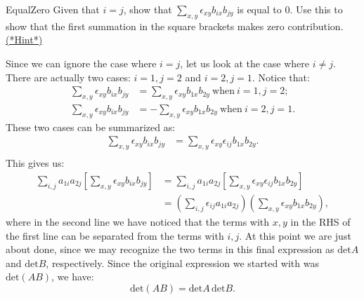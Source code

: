 \begin{exercise}{EqualZero}
Given that $i=j$, show that $\sum_{x,y} \epsilon_{xy}  b_{ix}b_{jy}$  is equal to 0. Use this to show that the first summation in the square brackets makes zero contribution. \hyperref[sec:sigma:hints]{(*Hint*)} 
\end{exercise}
Since we can ignore the case where $i=j$, let us look at the case where $i \neq j$.  There are actually two cases: $i=1, j=2$ and $i=2, j=1$.  Notice that:
\begin{align*}
 \sum_{x,y}\epsilon_{xy} b_{ix}b_{jy}&= \sum_{x,y} \epsilon_{xy} b_{1x}b_{2y}~\text{when}~i=1,j=2;\\
\sum_{x,y} \epsilon_{xy} b_{ix}b_{jy}&= - \sum_{x,y}\epsilon_{xy} b_{1x}b_{2y}~\text{when}~i=2,j=1.
\end{align*}
These two cases can be summarized as:
\begin{align*}
\sum_{x,y} \epsilon_{xy} b_{ix}b_{jy}&=\sum_{x,y}\epsilon_{xy}\epsilon_{ij} b_{1x}b_{2y}.\\
\end{align*}
This gives us:
\begin{align*}
 \sum_{i,j}  a_{1i}a_{2j} \left[\sum_{x,y} \epsilon_{xy} b_{ix}b_{jy}\right]&=  \sum_{i,j}  a_{1i}a_{2j} \left[\sum_{x,y} \epsilon_{xy} \epsilon_{ij} b_{1x}b_{2y}\right]\\
&=  \left(\sum_{i,j}\epsilon_{ij}   a_{1i}a_{2j}\right)\left(\sum_{x,y}  \epsilon_{xy} b_{1x}b_{2y}\right),
\end{align*}
where in the second line we have noticed that the terms with $x,y$ in the RHS of the first line can be separated from the terms with $i,j$.
At this point we are just about done, since we may recognize the two terms in this final expression as $\text{det} A$ and $\text{det} B$, respectively.
Since the original expression we started with was $\text{det}(AB)$, we have:
\[
\text{det}(AB)= \text{det}A \,\text{det}B.
\]

